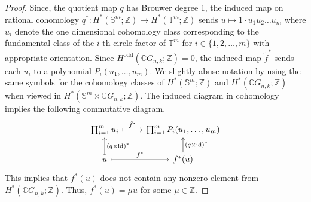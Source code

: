 \documentclass{amsart}
\newtheorem{remark}[theorem]{Remark}
\newcommand{\thmref}[1]{Theorem~\ref{#1}}
\begin{document}
\begin{proof}
		Since, the %
quotient map $q$ has Brouwer degree 1, the induced map on %
rational cohomology $q^*: H^*(\mathbb{S}^m; \mathbb{Z}) \rightarrow H^*(\mathbb{T}^m;\mathbb{Z})$ sends $u\mapsto 1\cdot u_1 u_2 \dots u_m$ where $u_i$ denote %
the one dimensional cohomology class corresponding to the fundamental class of the $i$-th circle factor of $\mathbb T^m$ for $i\in \{1,2,\ldots,m\}$ with appropriate orientation. 
		Since $H^{\mathrm{odd}}(\mathbb{C}G_{n,k};\mathbb Z)=0$, the induced map $\tilde f^*$ sends each $u_i$ to a polynomial $P_i(u_1,\dots,u_m)$.  We slightly abuse notation by using the same symbols for the cohomology classes of $H^*(\mathbb S^m;\mathbb Z)$ and $H^*(\mathbb{C}G_{n,k};\mathbb Z)$ when viewed in $H^*(\mathbb S^m\times \mathbb CG_{n,k};\mathbb Z)$.
		The induced diagram in cohomology implies the following %
commutative diagram.
		\[
		\begin{tikzcd}
			{\prod_{i=1}^m u_i} & {\prod_{i=1}^m P_i(u_1,\ldots,u_m)} \\
			u & {f^*(u)}
			\arrow["{\tilde f^*}", maps to, from=1-1, to=1-2]
			\arrow["{(q\times \mathrm{id})^*}"', maps to, from=2-1, to=1-1]
			\arrow["{f^*}", maps to, from=2-1, to=2-2]
			\arrow["{(q\times \mathrm{id})^*}"', maps to, from=2-2, to=1-2]
		\end{tikzcd}
		\]
		This %
implies that $f^*(u)$ does not contain any nonzero element from $H^*(\mathbb{C}G_{n,k};\mathbb Z)$.  
		Thus, $f^*(u)=\mu u$ for some $\mu\in \mathbb Z$.
	\end{proof}
	
	
	
	
	
	
	
	
	
\end{document}
